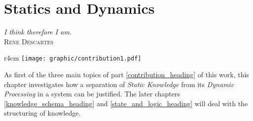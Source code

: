 %
%
%
%
%
%
%

\chapter{Statics and Dynamics}
\label{statics_and_dynamics_heading}

\begin{flushright}
    \textsl{I think therefore I am.}\\
    \textsc{Rene Descartes}
\end{flushright}

\begin{wrapfigure}[5]{r}{4cm}
    \texttt{[image: graphic/contribution1.pdf]}
\end{wrapfigure}

As first of the three main topics of part \ref{contribution_heading} of this
work, this chapter investigates how a separation of \emph{Static Knowledge}
from its \emph{Dynamic Processing} in a system can be justified. The later
chapters \ref{knowledge_schema_heading} and \ref{state_and_logic_heading} will
deal with the structuring of knowledge.
\vspace{1cm}




